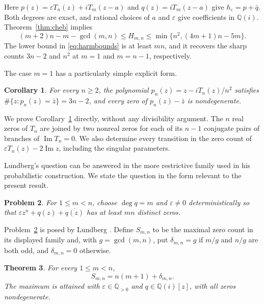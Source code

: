 \documentclass[a4paper]{amsart}
\newtheorem{thm}{Theorem}
\newtheorem{cor}[thm]{Corollary}
\newtheorem{problem}[thm]{Problem}
\theoremstyle{remark}
\newcommand{\Q}{\mathbb Q}
\newcommand{\eps}{\varepsilon}
\DeclareMathOperator{\Ima}{Im}
\begin{document}
Here \(p(z)=\eps T_n(z)+iT_m(z-a)\) and \(q(z)=iT_m(z-a)\)
give \(h_\eps=p+\bar q\). Both degrees are exact, and rational
choices of \(a\) and \(\eps\) give coefficients in \(\Q(i)\).
Theorem~\ref{thm:cheb} implies
\begin{equation}\label{eq:harmbounds}
 (m+2)n-m-\gcd(m,n)
 \le H_{m,n}\le \min\{n^2,(4m+1)n-5m\}.
\end{equation}
The lower bound in \eqref{eq:harmbounds} is at least \(mn\),
and it recovers the sharp counts \(3n-2\) and \(n^2\) at
\(m=1\) and \(m=n-1\), respectively.

The case \(m=1\) has a particularly simple explicit form.

\begin{cor}\label{cor:explicit}
For every \(n\ge2\), the polynomial
\(p_n(z)=z-iT_n(z)/n^2\) satisfies
\(\#\{z:p_n(z)=\bar z\}=3n-2\), and every zero of
\(p_n(z)-\bar z\) is nondegenerate.
\end{cor}

We prove Corollary~\ref{cor:explicit} directly, without any
divisibility argument. The \(n\) real zeros of \(T_n\) are joined
by two nonreal zeros for each of its \(n-1\) conjugate pairs of
branches of \(\Ima T_n=0\). We also determine every transition in the zero
count of \(\eps T_n(z)-2\Ima z\), including the singular parameters.

Lundberg's question can be answered in the more restrictive family
used in his probabilistic construction. We state the question in
the form relevant to the present result.

\begin{problem}\label{prob:deterministic}
For \(1\le m<n\), choose \(\deg q=m\) and \(\eps\ne0\)
deterministically so that \(\eps z^n+q(z)+\overline{q(z)}\)
has at least \(mn\) distinct zeros.
\end{problem}

Problem~\ref{prob:deterministic} is posed by Lundberg
\cite[Section 4.2]{Lun23}. Define \(S_{m,n}\) to be the maximal
zero count in its displayed family and, with \(g=\gcd(m,n)\), put
\(\delta_{m,n}=g\) if \(m/g\) and \(n/g\) are both odd, and
\(\delta_{m,n}=0\) otherwise.

\begin{thm}\label{thm:monomial}
For every \(1\le m<n\),
\begin{equation}\label{eq:monomialmax}
 S_{m,n}=n(m+1)+\delta_{m,n}.
\end{equation}
The maximum is attained with \(\eps\in\Q_{>0}\) and
\(q\in\Q(i)[z]\), with all zeros nondegenerate.
\end{thm}
\end{document}
